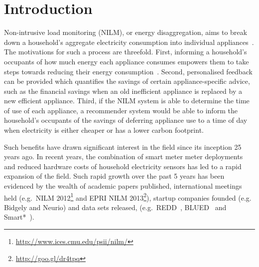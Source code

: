 \documentclass{sig-alternate}
\begin{document}
\section{Introduction}

\noindent
Non-intrusive load monitoring (NILM), or energy disaggregation, aims to break down a household's aggregate electricity consumption into individual appliances~\cite{hart_1992}. The motivations for such a process are threefold. First, informing a household's occupants of how much energy each appliance consumes empowers them to take steps towards reducing their energy consumption~\cite{darby_2006}. Second, personalised feedback can be provided which quantifies the savings of certain appliance-specific advice, such as the financial savings when an old inefficient appliance is replaced by a new efficient appliance. Third, if the NILM system is able to determine the time of use of each appliance, a recommender system would be able to inform the household's occupants of the savings of deferring appliance use to a time of day when electricity is either cheaper or has a lower carbon footprint.

Such benefits have drawn significant interest in the field since its inception 25 years ago. In recent years, the combination of smart meter meter deployments~\cite{CaliforniaPublicUtilitiesCommission2006,DepartmentofEnergy&ClimateChange2013} and reduced hardware costs of household electricity sensors has led to a rapid expansion of the field. Such rapid growth over the past 5 years has been evidenced by the wealth of academic papers published, international meetings held (e.g.\ NILM 2012\footnote{\url{http://www.ices.cmu.edu/psii/nilm/}} and EPRI NILM 2013\footnote{\url{http://goo.gl/dr4tpq}}), startup companies founded (e.g. Bidgely and Neurio) and data sets released, (e.g.\ REDD~\cite{redd}, BLUED~\cite{blued} and Smart*~\cite{smart}).
\end{document}
